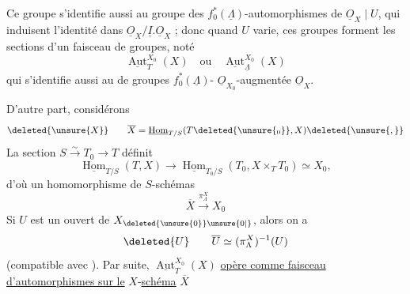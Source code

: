 Ce groupe s'identifie aussi au groupe des $f_0^*(\underline{\Lambda})$-automorphismes de $\underline{O}_X\mid U$, qui induisent l'identité dans $\underline{O}_X/\underline{I}.\underline{O}_X$ ; donc quand $U$ varie, ces groupes forment les sections d'un faisceau de groupes, noté
\[
\underline{\operatorname{Aut}}^{X_0}_T(X)\quad\text{ou}\quad\underline{\operatorname{Aut}}^{X_0}_{\underline{\Lambda}}(X)
\]
qui s'identifie aussi au  de  groupes   $f_0^*(\underline{\Lambda})$- $\underline{O}_{X_0}$-augmentée $\underline{O}_X$.

D'autre part, considérons  
\[
\deleted{\unsure{X}}\qquad\overline X=\underline{\operatorname{Hom}}_{T/S}(T\deleted{\unsure{_0}},X)\deleted{\unsure{,}}
\]
La  section $S\xrightarrow{\sim}T_0\longrightarrow T$ définit
\[
\underline{\operatorname{Hom}}_{T/S}(T,X)\longrightarrow\underline{\operatorname{Hom}}_{T_0/S}(T_0,X\times_T T_0)\simeq X_0,
\]
d'où un homomorphisme de $S$-schémas
\[
\overline X\xrightarrow{\pi_\Lambda^X}X_0
\]
Si $U$ est un ouvert de $X_{\deleted{\unsure{0}}\unsure{0|{}}}$, alors on a
\[
\deleted{U}\qquad\overline U\simeq(\pi_\Lambda^X)^{-1}(U)
\]
(compatible avec ).
Par suite, $\underline{\operatorname{Aut}}^{X_0}_T(X)$ \uline{opère comme faisceau d'automorphismes sur le} $X$-\uline{schéma} $\overline X$


